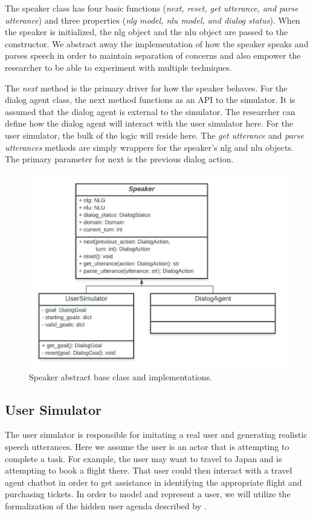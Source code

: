 The speaker class has four basic functions (\textit{next, reset, get utterance, and parse utterance}) and three properties (\textit{nlg model, nlu model, and dialog status}). When the speaker is initialized, the nlg object and the nlu object are passed to the constructor. We abstract away the implementation of how the speaker speaks and parses speech in order to maintain separation of concerns and also empower the researcher to be able to experiment with multiple techniques. 

The \textit{next} method is the primary driver for how the speaker behaves. For the dialog agent class, the next method functions as an API to the simulator. It is assumed that the dialog agent is external to the simulator. The researcher can define how the dialog agent will interact with the user simulator here. For the user simulator, the bulk of the logic will reside here. The \textit{get utterance} and \textit{parse utterances} methods are simply wrappers for the speaker's nlg and nlu objects. The primary parameter for next is the previous dialog action. 

\begin{figure}[h!]
	\centering
	\includegraphics[width=\linewidth]{diagrams/speaker_classes.jpeg}
	\caption{ Speaker abstract base class and implementations.}
	\label{fig:speaker_class}
\end{figure}

\subsection{User Simulator}
The user simulator is responsible for imitating a real user and generating realistic speech utterances. Here we assume the user is an actor that is attempting to complete a task. For example, the user may want to travel to Japan and is attempting to book a flight there. That user could then interact with a travel agent chatbot in order to get assistance in identifying the appropriate flight and purchasing tickets. In order to model and represent a user, we will utilize the formalization of the hidden user agenda described by \cite{Schatzmann2009TheHA}.

